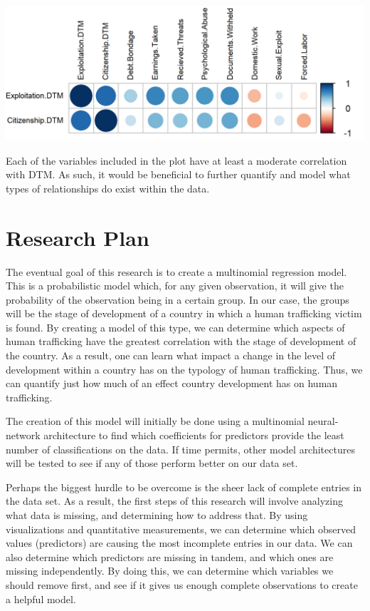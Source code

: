 \documentclass{article} %
\begin{document}
\hspace*{-1.5cm}
\includegraphics{Corrplot} \bigskip

Each of the variables included in the plot have at least a moderate correlation with DTM. As such, it would be beneficial to further quantify and model what types of relationships do exist within the data.


\section{Research Plan}

The eventual goal of this research is to create a multinomial regression model. This is a probabilistic model which, for any given observation, it will give the probability of the observation being in a certain group. In our case, the groups will be the stage of development of a country in which a human trafficking victim is found. By creating a model of this type, we can determine which aspects of human trafficking have the greatest correlation with the stage of development of the country. As a result, one can learn what impact a change in the level of development within a country has on the typology of human trafficking. Thus, we can quantify just how much of an effect country development has on human trafficking.

The creation of this model will initially be done using a multinomial neural-network architecture to find which coefficients for predictors provide the least number of classifications on the data. If time permits, other model architectures will be tested to see if any of those perform better on our data set.


Perhaps the biggest hurdle to be overcome is the sheer lack of complete entries in the data set. As a result, the first steps of this research will involve analyzing what data is missing, and determining how to address that. By using visualizations and quantitative measurements, we can determine which observed values (predictors) are causing the most incomplete entries in our data. We can also determine which predictors are missing in tandem, and which ones are missing independently. By doing this, we can determine which variables we should remove first, and see if it gives us enough complete observations to create a helpful model.
\end{document}
